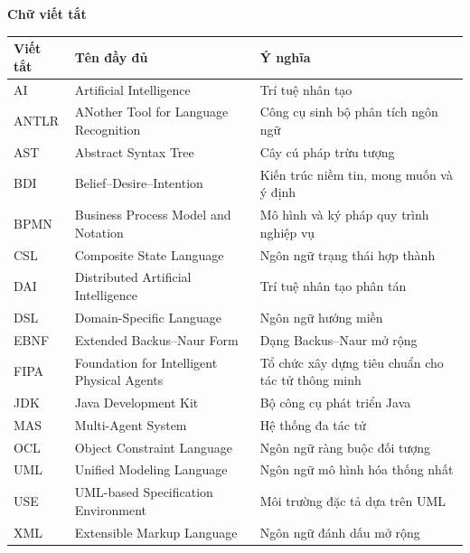 \documentclass[12pt,a4paper,oneside]{extreport}
\begin{document}
\begingroup
\fontsize{11.5}{14.5}\selectfont
\setlength{\parskip}{4pt}
\renewcommand{\arraystretch}{1.05}
\noindent\textbf{Chữ viết tắt}\par\nopagebreak[4]
\noindent
\begin{tabular}{@{}p{.14\linewidth}>{\raggedright\arraybackslash}p{.41\linewidth}>{\raggedright\arraybackslash}p{.39\linewidth}@{}}
\toprule
\textbf{Viết tắt} & \textbf{Tên đầy đủ} & \textbf{Ý nghĩa} \\
\midrule
AI & Artificial Intelligence & Trí tuệ nhân tạo \\
ANTLR & ANother Tool for Language Recognition & Công cụ sinh bộ phân tích ngôn ngữ \\
AST & Abstract Syntax Tree & Cây cú pháp trừu tượng \\
BDI & Belief--Desire--Intention & Kiến trúc niềm tin, mong muốn và ý định \\
BPMN & Business Process Model and Notation & Mô hình và ký pháp quy trình nghiệp vụ \\
CSL & Composite State Language & Ngôn ngữ trạng thái hợp thành \\
DAI & Distributed Artificial Intelligence & Trí tuệ nhân tạo phân tán \\
DSL & Domain-Specific Language & Ngôn ngữ hướng miền \\
EBNF & Extended Backus--Naur Form & Dạng Backus--Naur mở rộng \\
FIPA & Foundation for Intelligent Physical Agents & Tổ chức xây dựng tiêu chuẩn cho tác tử thông minh \\
JDK & Java Development Kit & Bộ công cụ phát triển Java \\
MAS & Multi-Agent System & Hệ thống đa tác tử \\
OCL & Object Constraint Language & Ngôn ngữ ràng buộc đối tượng \\
UML & Unified Modeling Language & Ngôn ngữ mô hình hóa thống nhất \\
USE & UML-based Specification Environment & Môi trường đặc tả dựa trên UML \\
XML & Extensible Markup Language & Ngôn ngữ đánh dấu mở rộng \\
\bottomrule
\end{tabular}
\end{document}
